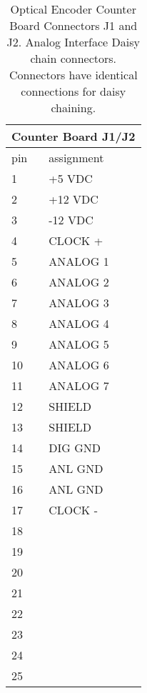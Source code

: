 \begin{table}[htb]
\begin{center}
\begin{tabular}{|l|l|}
\hline
\multicolumn{2}{|c|}{Counter Board J1/J2}\\
\hline
pin & assignment\\
\hline
 1 & +5 VDC\\
 2 & +12 VDC\\
 3 & -12 VDC\\
 4 & CLOCK +\\
 5 & ANALOG 1\\
 6 & ANALOG 2\\
 7 & ANALOG 3\\
 8 & ANALOG 4\\
 9 & ANALOG 5\\
10 & ANALOG 6\\
11 & ANALOG 7\\
12 & SHIELD\\
13 & SHIELD\\
14 & DIG GND\\
15 & ANL GND\\
16 & ANL GND\\
17 & CLOCK -\\
18 & \\
19 & \\
20 & \\
21 & \\
22 & \\
23 & \\
24 & \\
25 & \\
\hline
\end{tabular}
\caption[Optical Encoder Counter Board Connectors J1/J2]
        {Optical Encoder Counter Board Connectors J1 and J2.
         Analog Interface Daisy chain connectors.
         Connectors have identical connections for daisy chaining.
        }
\end{center}
\end{table}
  
